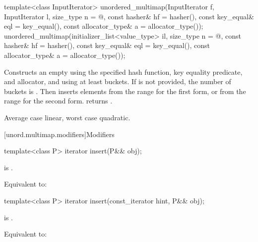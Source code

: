 %
\begin{itemdecl}
template<class InputIterator>
  unordered_multimap(InputIterator f, InputIterator l,
                     size_type n = @\seebelow@,
                     const hasher& hf = hasher(),
                     const key_equal& eql = key_equal(),
                     const allocator_type& a = allocator_type());
unordered_multimap(initializer_list<value_type> il,
                   size_type n = @\seebelow@,
                   const hasher& hf = hasher(),
                   const key_equal& eql = key_equal(),
                   const allocator_type& a = allocator_type());
\end{itemdecl}

\begin{itemdescr}
\pnum
\effects
Constructs an empty  using the
specified hash function, key equality predicate, and allocator, and
using at least  buckets. If  is not
provided, the number of buckets is . Then
inserts elements from the range 
for the first form, or from the range
 for the second form.
 returns .

\pnum
\complexity
Average case linear, worst case quadratic.
\end{itemdescr}

[unord.multimap.modifiers]{Modifiers}

%
\begin{itemdecl}
template<class P>
  iterator insert(P&& obj);
\end{itemdecl}

\begin{itemdescr}
\pnum
\constraints
{} is .

\pnum
\effects
Equivalent to: 
\end{itemdescr}

%
\begin{itemdecl}
template<class P>
  iterator insert(const_iterator hint, P&& obj);
\end{itemdecl}

\begin{itemdescr}
\pnum
\constraints
{} is .

\pnum
\effects
Equivalent to:
\end{itemdescr}

